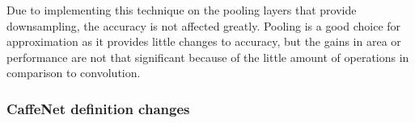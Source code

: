 \begin{enumerate}
\begin{table}[H]
    \begin{center}
        \caption{Execution time, error rate and resource usage for memoization on different layer combinations.}
            \label{tab:memoization}
    \end{center}
\end{table}

Due to implementing this technique on the pooling layers that provide downsampling, the accuracy
is not affected greatly. Pooling is a good choice for approximation as it provides little changes
to accuracy, but the gains in area or performance are not that significant because of the little
amount of operations in comparison to convolution.

\subsubsection{CaffeNet definition changes}


\end{enumerate}
